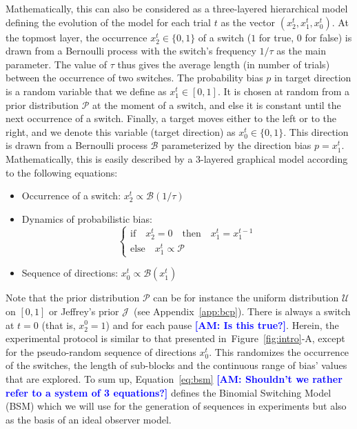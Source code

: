 \documentclass[12pt,english]{article}%
\newcommand{\choice}[1]{ %
	\left\{ %
		\begin{array}{l} #1 \end{array} %
	\right. }
\newcommand{\eql}[1]{\begin{equation}#1\end{equation}}
\newcommand{\Bb}{\mathcal{B}}
\newcommand{\Jj}{\mathcal{J}}
\newcommand{\Pp}{\mathcal{P}}
\newcommand{\Uu}{\mathcal{U}}
\newcommand{\seeFig}[1]{Figure~\ref{fig:#1}}
\newcommand{\seeEq}[1]{Equation~\ref{eq:#1}}
\newcommand{\seeApp}[1]{Appendix~\ref{app:#1}}
\newcommand{\AM}[1]{\textbf{\textcolor{blue}{[AM: #1]}}}
\begin{document}
Mathematically, this can also be considered as a three-layered hierarchical model
defining the evolution of the model for each trial $t$ as the vector  $(x_2^t, x_1^t, x_0^t)$.
At the topmost layer,
the occurrence $x_2^t \in \{ 0, 1 \}$ of a switch ($1$ for true, $0$ for false)
is  drawn from a Bernoulli process with the switch's frequency $1/\tau$ as the main parameter.
The value of $\tau$ thus gives the average length (in number of trials)
between the occurrence of two switches.
The probability bias $p$ in target direction is a random variable that we define as $x_1^t \in [0, 1]$.
It is chosen at random from a prior distribution $\Pp$ at the moment of a switch,
and else it is constant until the next occurrence of a switch.
Finally, a target moves either to the left or to the right,
and we denote this variable (target direction) as $x_0^t \in \{ 0, 1 \}$.
This direction is drawn from a Bernoulli process $\Bb$
parameterized by the direction bias $p=x_1^t$.
Mathematically, this is easily described
by a 3-layered graphical model according to %
the following equations:
\begin{itemize}
    \item Occurrence of a switch: $x_2^t \propto \Bb(1/\tau)$
    \item Dynamics of probabilistic bias: \eql{\choice{\text{if} \quad x_2^t=0 \quad \text{then} \quad  x_1^t = x_1^{t-1} \\
\text{else} \quad x_1^t \propto \Pp  }\label{eq:bsm}}
    \item Sequence of directions:  $x_0^t \propto \Bb(x_1^t)$
\end{itemize}
Note that the prior distribution $\Pp$ can be for instance
the uniform distribution $\Uu$ on $ [ 0, 1 ] $ or
Jeffrey's prior $\Jj$~(see \seeApp{bcp}).
There is always a switch at $t=0$ (that is, $x_2^0=1$) and for each pause \AM{Is this true?}.
Herein, the experimental protocol is similar 
to that presented in~\seeFig{intro}-A, 
except for the pseudo-random sequence of directions $x_0^t$. 
This randomizes the occurrence of the switches,
the length of sub-blocks 
and the continuous range of bias' values that are explored.
To sum up, \seeEq{bsm} \AM{Shouldn't we rather refer to a system of 3 equations?} defines the Binomial Switching Model (BSM)
which we will use for the generation of sequences in experiments
but also as the basis of an ideal observer model.
\end{document}
